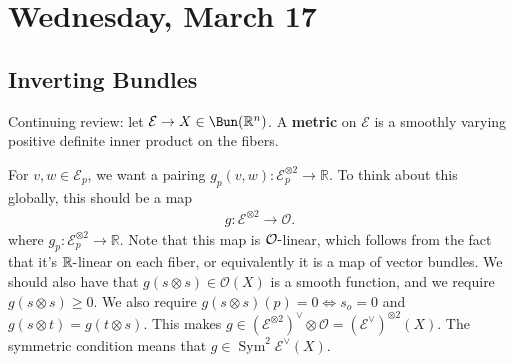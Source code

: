 \hypertarget{wednesday-march-17}{%
\section{Wednesday, March 17}\label{wednesday-march-17}}

\hypertarget{inverting-bundles}{%
\subsection{Inverting Bundles}\label{inverting-bundles}}

\begin{remark}

Continuing review: let \(\mathcal{E} \to X \in \Bun({\mathbb{R}}^n)\). A
\textbf{metric} on \(\mathcal{E}\) is a smoothly varying positive
definite inner product on the fibers.

\begin{figure}
\centering
{}
\end{figure}

For \(v, w\in \mathcal{E}_p\), we want a pairing
\(g_p(v, w): \mathcal{E}_p^{\otimes 2} \to {\mathbb{R}}\). To think
about this globally, this should be a map
\begin{align*}
g: \mathcal{E}^{\otimes 2} \to {\mathcal{O}}
.\end{align*}
where \(g_p: \mathcal{E}_p^{\otimes 2} \to {\mathbb{R}}\). Note that
this map is \({\mathcal{O}}{\hbox{-}}\)linear, which follows from the
fact that it's \({\mathbb{R}}{\hbox{-}}\)linear on each fiber, or
equivalently it is a map of vector bundles. We should also have that
\(g(s\otimes s) \in {\mathcal{O}}(X)\) is a smooth function, and we
require \(g(s\otimes s) \geq 0\). We also require
\(g(s\otimes s)(p) = 0 \iff s_o = 0\) and
\(g(s\otimes t) = g(t\otimes s)\). This makes
\(g\in (\mathcal{E}^{\otimes 2})^\vee\otimes{\mathcal{O}}= (\mathcal{E}^\vee)^{\otimes 2}(X)\).
The symmetric condition means that
\(g\in \operatorname{Sym}^2 \mathcal{E}^\vee(X)\).

\end{remark}

